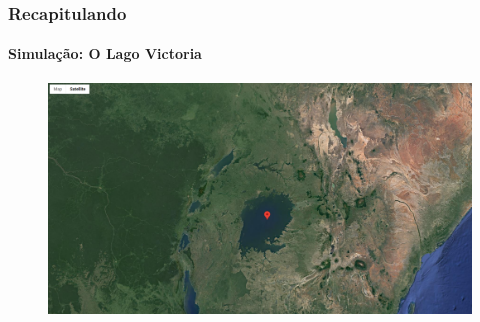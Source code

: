 \documentclass[aspectratio=169]{beamer} %
\begin{document}
{{\begin{frame}
\end{frame} 
}

{
\begin{frame}

\frametitle{Recapitulando}
	\framesubtitle{Simulação: O Lago Victoria}
	\pause
	\begin{figure}
		\centering
		\includegraphics[scale=0.15]{images/victoria1.png}
	\end{figure}
\end{frame} 
}

{
\begin{frame}


\end{frame}}}
\end{document}
